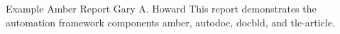 \documentclass[10pt]{tlc-article}
\begin{document}
  \tlcTitlePageAndTableOfContents
    {Example Amber Report}
    {Gary A. Howard}
    {This report demonstrates the automation framework components amber,
    autodoc, docbld, and tlc-article.}

 
\end{document}
